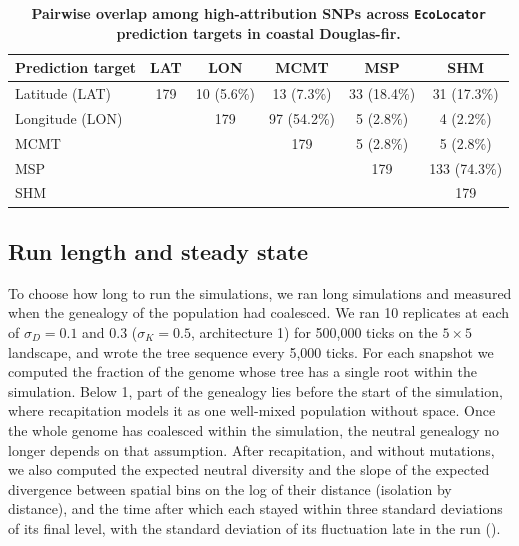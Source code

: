 \documentclass[]{article}
\newcommand{\dfir}{Douglas-fir\xspace}
\newcommand{\ecolocator}{\texttt{EcoLocator}\xspace}
\begin{document}
\begin{table}[ht]
  \centering
  \caption{\textbf{Pairwise overlap among high-attribution SNPs across 
  \ecolocator prediction targets in coastal \dfir.}}
  \label{tab:dfir-shap-overlap}
  \begin{tabular}{@{}lccccc@{}}
  \hline
  \textbf{Prediction target} & \textbf{LAT} & \textbf{LON} & \textbf{MCMT} & \textbf{MSP} & \textbf{SHM} \\
  \hline
  Latitude (LAT)  & 179 & 10 (5.6\%) & 13 (7.3\%) & 33 (18.4\%) & 31 (17.3\%) \\
  Longitude (LON) &     & 179        & 97 (54.2\%) & 5 (2.8\%) & 4 (2.2\%) \\
  MCMT            &     &            & 179         & 5 (2.8\%) & 5 (2.8\%) \\
  MSP             &     &            &             & 179       & 133 (74.3\%) \\
  SHM             &     &            &             &           & 179 \\
  \hline
  \end{tabular}
\end{table}

\subsection*{Run length and steady state}

To choose how long to run the simulations,
we ran long simulations and measured when the genealogy
of the population had coalesced.
We ran 10 replicates at each of $\sigma_D = 0.1$ and 0.3
($\sigma_K = 0.5$, architecture 1)
for 500,000 ticks on the $5 \times 5$ landscape,
and wrote the tree sequence every 5,000 ticks.
For each snapshot we computed the fraction of the genome
whose tree has a single root within the simulation.
Below 1, part of the genealogy lies before the start of the simulation,
where recapitation models it as one well-mixed population without space.
Once the whole genome has coalesced within the simulation,
the neutral genealogy no longer depends on that assumption.
After recapitation, and without mutations,
we also computed the expected neutral diversity
and the slope of the expected divergence between spatial bins
on the log of their distance (isolation by distance),
and the time after which each stayed within three standard deviations
of its final level, with the standard deviation of its fluctuation
late in the run ().
\end{document}
